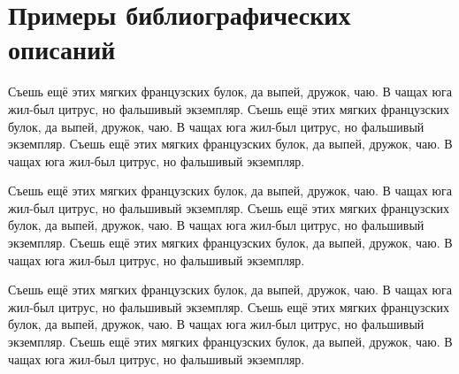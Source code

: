 \chapter{Примеры библиографических описаний}

Съешь ещё этих мягких французских булок, да выпей, дружок, чаю. В чащах юга жил-был цитрус, но фальшивый экземпляр. Съешь ещё этих мягких французских булок, да выпей, дружок, чаю. В чащах юга жил-был цитрус, но фальшивый экземпляр. Съешь ещё этих мягких французских булок, да выпей, дружок, чаю. В чащах юга жил-был цитрус, но фальшивый экземпляр.

Съешь ещё этих мягких французских булок, да выпей, дружок, чаю. В чащах юга жил-был цитрус, но фальшивый экземпляр. Съешь ещё этих мягких французских булок, да выпей, дружок, чаю. В чащах юга жил-был цитрус, но фальшивый экземпляр. Съешь ещё этих мягких французских булок, да выпей, дружок, чаю. В чащах юга жил-был цитрус, но фальшивый экземпляр.

Съешь ещё этих мягких французских булок, да выпей, дружок, чаю. В чащах юга жил-был цитрус, но фальшивый экземпляр. Съешь ещё этих мягких французских булок, да выпей, дружок, чаю. В чащах юга жил-был цитрус, но фальшивый экземпляр. Съешь ещё этих мягких французских булок, да выпей, дружок, чаю. В чащах юга жил-был цитрус, но фальшивый экземпляр.